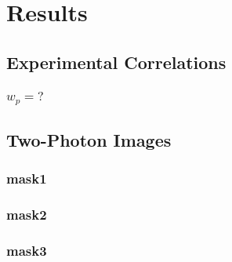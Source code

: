 
\chapter{Results} %

\label{Chapter4} %


\section{Experimental Correlations }


\subsection{$w_p = ?$}



\section{Two-Photon Images}


\subsection{mask1}
\subsection{mask2}
\subsection{mask3}
